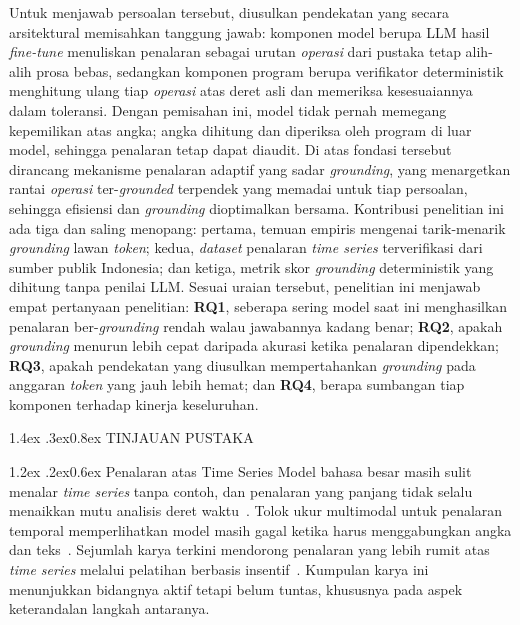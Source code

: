 \documentclass[10pt,a4paper,twocolumn]{article}
\makeatletter
\renewcommand\section{\@startsection{section}{1}{\z@}%
  {1.4ex \@plus .3ex}{0.8ex}%
  {\normalfont\small\bfseries}}
\renewcommand\subsection{\@startsection{subsection}{2}{\z@}%
  {1.2ex \@plus .2ex}{0.6ex}%
  {\normalfont\small\bfseries\itshape}}
\makeatother
\begin{document}
Untuk menjawab persoalan tersebut, diusulkan pendekatan yang secara arsitektural
memisahkan tanggung jawab: komponen model berupa LLM hasil \textit{fine-tune}
menuliskan penalaran sebagai urutan \textit{operasi} dari pustaka tetap alih-alih
prosa bebas, sedangkan komponen program berupa verifikator deterministik
menghitung ulang tiap \textit{operasi} atas deret asli dan memeriksa kesesuaiannya
dalam toleransi. Dengan pemisahan ini, model tidak pernah memegang kepemilikan
atas angka; angka dihitung dan diperiksa oleh program di luar model, sehingga
penalaran tetap dapat diaudit. Di atas fondasi tersebut dirancang mekanisme
penalaran adaptif yang sadar \textit{grounding}, yang menargetkan rantai
\textit{operasi} ter-\textit{grounded} terpendek yang memadai untuk tiap
persoalan, sehingga efisiensi dan \textit{grounding} dioptimalkan bersama.
Kontribusi penelitian ini ada tiga dan saling menopang: pertama, temuan empiris
mengenai tarik-menarik \textit{grounding} lawan \textit{token}; kedua,
\textit{dataset} penalaran \textit{time series} terverifikasi dari sumber publik
Indonesia; dan ketiga, metrik skor \textit{grounding} deterministik yang dihitung
tanpa penilai LLM. Sesuai uraian tersebut, penelitian ini menjawab empat
pertanyaan penelitian: \textbf{RQ1}, seberapa sering model saat ini menghasilkan
penalaran ber-\textit{grounding} rendah walau jawabannya kadang benar;
\textbf{RQ2}, apakah \textit{grounding} menurun lebih cepat daripada akurasi
ketika penalaran dipendekkan; \textbf{RQ3}, apakah pendekatan yang diusulkan
mempertahankan \textit{grounding} pada anggaran \textit{token} yang jauh lebih
hemat; dan \textbf{RQ4}, berapa sumbangan tiap komponen terhadap kinerja
keseluruhan.

\section{TINJAUAN PUSTAKA}

\subsection{Penalaran atas Time Series}
Model bahasa besar masih sulit menalar \textit{time series} tanpa contoh, dan
penalaran yang panjang tidak selalu menaikkan mutu analisis deret
waktu~\cite{merrill2024}. Tolok ukur multimodal untuk penalaran temporal
memperlihatkan model masih gagal ketika harus menggabungkan angka dan
teks~\cite{mtbench2025}. Sejumlah karya terkini mendorong penalaran yang lebih
rumit atas \textit{time series} melalui pelatihan berbasis
insentif~\cite{timeomni2026}. Kumpulan karya ini menunjukkan bidangnya aktif
tetapi belum tuntas, khususnya pada aspek keterandalan langkah antaranya.
\end{document}
